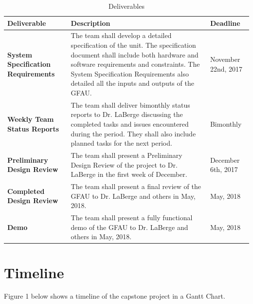 \documentclass[12pt]{extarticle}
\begin{document}
    \begin{table}[h]

        \renewcommand{\arraystretch}{1.8}
        \caption{Deliverables}
        \centering

        \begin{tabular}{ | p{10em} | p{16em} | l |}

            \hline \textbf{Deliverable} & \textbf{Description} &
            \textbf{Deadline} \\

            \hline \textbf{System Specification Requirements} & The team shall
            develop a detailed specification of the unit. The specification
            document shall include both hardware and software requirements and
            constraints. The System Specification Requirements also detailed
            all the inputs and outputs of the GFAU. & November 22nd, 2017 \\

            \hline \textbf{Weekly Team Status Reports} & The team shall deliver
            bimonthly status reports to Dr. LaBerge discussing the completed
            tasks and issues encountered during the period. They shall also
            include planned tasks for the next period. & Bimonthly \\

            \hline \textbf{Preliminary Design Review} & The team shall present
            a Preliminary Design Review of the project to Dr. LaBerge in the
            first week of December. & December 6th, 2017 \\

            \hline \textbf{Completed Design Review} & The team shall present a
            final review of the GFAU to Dr. LaBerge and others in May, 2018. &
            May, 2018 \\

            \hline \textbf{Demo} & The team shall present a fully functional
            demo of the GFAU to Dr. LaBerge and others in May, 2018. & May,
            2018 \\

            \hline

        \end{tabular}

    \end{table}

    \section{Timeline} Figure 1 below shows a timeline of the capstone project
    in a Gantt Chart.
\end{document}
